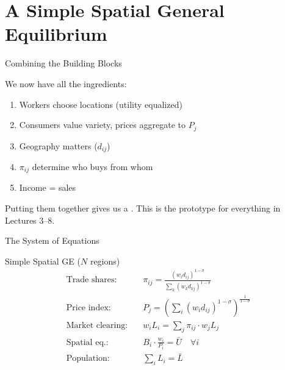 \documentclass{beamer}
\begin{document}

\section{A Simple Spatial General Equilibrium}

\begin{frame}{Combining the Building Blocks}

    We now have all the ingredients:

    \vspace{0.3em}
    \begin{enumerate}
        \item {} Workers choose locations (utility equalized)
        \item {} Consumers value variety, prices aggregate to $P_j$
        \item {} Geography matters ($d_{ij}$)
        \item {} $\pi_{ij}$ determine who buys from whom
        \item {} Income = sales
    \end{enumerate}

    \vspace{0.5em}
    Putting them together gives us a . This is the prototype for everything in Lectures 3--8.

\end{frame}

\begin{frame}{The System of Equations}

    \begin{block}{Simple Spatial GE ($N$ regions)}
    {\footnotesize
    \begin{align}
        \text{Trade shares:} \quad & \pi_{ij} = \frac{(w_i d_{ij})^{1-\sigma}}{\sum_k (w_k d_{kj})^{1-\sigma}} \label{eq:shares} \\[3pt]
        \text{Price index:} \quad & P_j = \left(\sum_i (w_i d_{ij})^{1-\sigma}\right)^{\frac{1}{1-\sigma}} \label{eq:price} \\[3pt]
        \text{Market clearing:} \quad & w_i L_i = \sum_j \pi_{ij} \cdot w_j L_j \label{eq:mc} \\[3pt]
        \text{Spatial eq.:} \quad & B_i \cdot \frac{w_i}{P_i} = \bar{U} \quad \forall i \label{eq:spatial} \\[3pt]
        \text{Population:} \quad & \sum_i L_i = \bar{L} \label{eq:pop}
    \end{align}
    }
    \end{block}


\end{frame}
\end{document}
